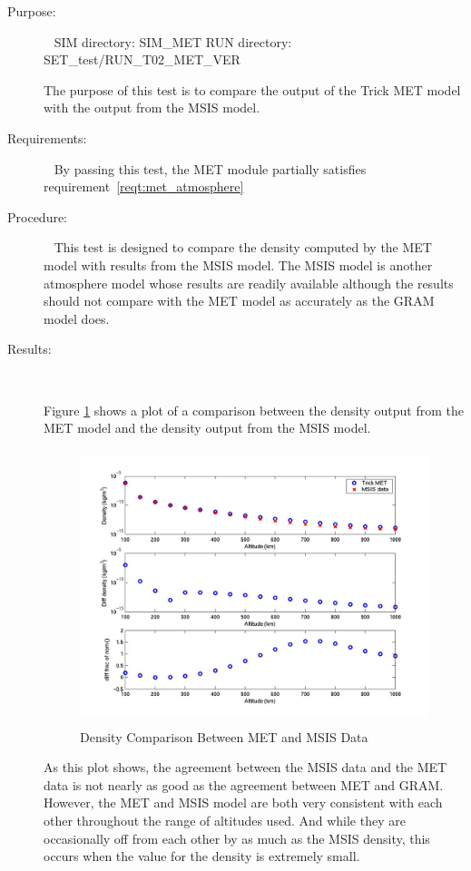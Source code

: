 \label{test:met_MSIS}
\begin{description}
\item[Purpose:] \ \newline
SIM directory: SIM\_MET \newline
RUN directory: SET\_test/RUN\_T02\_MET\_VER

The purpose of this test is to compare the output of the Trick MET model
with the output from the MSIS model.

\item[Requirements:] \ \newline
By passing this test, the MET module partially satisfies
requirement~\ref{reqt:met_atmosphere}
\item[Procedure:]\ \newline
This test is designed to compare the density computed by the MET model
with results from the MSIS model.  The MSIS model is another atmosphere
model whose results are readily available although the results should
not compare with the MET model as accurately as the GRAM model does.

\item[Results:]\ \newline

Figure \ref{MET_MSIS_compare} shows a plot of a comparison between the density
output from the MET model and the density output from the MSIS model.

\begin{figure}[H]
\begin{center}
\includegraphics[height=80mm]{pics/MET_MSIS_T01_temperature.jpg}
\caption{Density Comparison Between MET and MSIS Data}
\label{MET_MSIS_compare}
\end{center}
\end{figure}

As this plot shows, the agreement between the MSIS data and the MET data is
not nearly as good as the agreement between MET and GRAM.  However, the MET
and MSIS model are both very consistent with each other throughout the range
of altitudes used.  And while they are occasionally off from each other by
as much as the MSIS density, this occurs when the value for the density is
extremely small.
\end{description}

